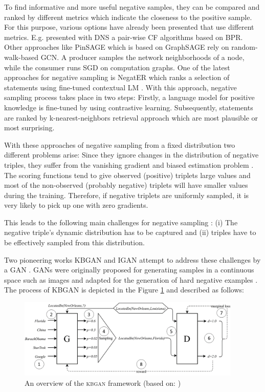 To find informative and more useful negative samples, they can be compared and ranked by different metrics which indicate the closeness to the positive sample.
For this purpose, various options have already been presented that use different metrics.
E.g. \cite{DNS} presented with \ac{DNS} a pair-wise \ac{CF} algorithms based on \ac{BPR}.
Other approaches like \ac{PinSAGE} \cite{PinSAGE} which is based on \ac{GraphSAGE} \cite{GraphSAGE} rely on random-walk-based \ac{GCN}. 
A producer samples the network neighborhoods of a node, while the consumer runs \ac{SGD} on computation graphs.    
One of the latest approaches for negative sampling is \ac{NegatER}
which ranks a selection of statements using fine-tuned contextual \ac{LM} \cite{safavi2021negater}.
With this approach, negative sampling process takes place in two steps:
Firstly, a language model for positive knowledge is fine-tuned by using contrastive learning.
Subsequently, statements are ranked by k-nearest-neighbors retrieval approach which are most plausible or most surprising.

With these approaches of negative sampling from a fixed distribution two different problems arise:
Since they ignore changes in the distribution of negative triples, they suffer from the vanishing gradient and biased estimation problem \cite{zhang2021efficient}.
The scoring functions tend to give observed (positive) triplets large values and most of the non-observed (probably negative) triplets will have smaller values during the training.
Therefore, if negative triplets are uniformly sampled, it is very likely to pick up one with zero gradients.

This leads to the following main challenges for negative sampling \cite{zhang2021efficient}: 
(i) The negative triple's dynamic distribution has to be captured and (ii) triples have to be effectively sampled from this distribution.

Two pioneering works \ac{KBGAN} \cite{cai2017kbgan} and \ac{IGAN} \cite{IGAN} attempt to address these challenges by a \ac{GAN} \cite{zhang2021efficient}.
\acp{GAN} were originally proposed for generating samples in a continuous space such as images and adapted for the generation of hard negative examples \cite{zhang2021efficient}.
The process of \ac{KBGAN} is depicted in the Figure \ref{fig:overview} and described as follows:
\begin{figure}[t]
  \centering
    \includegraphics[width=0.95\textwidth]{figures/kbgan_original.png}
  \caption{An overview of the \textsc{kbgan} framework (based on: \cite{cai2017kbgan})}
  \label{fig:overview}
\end{figure}

